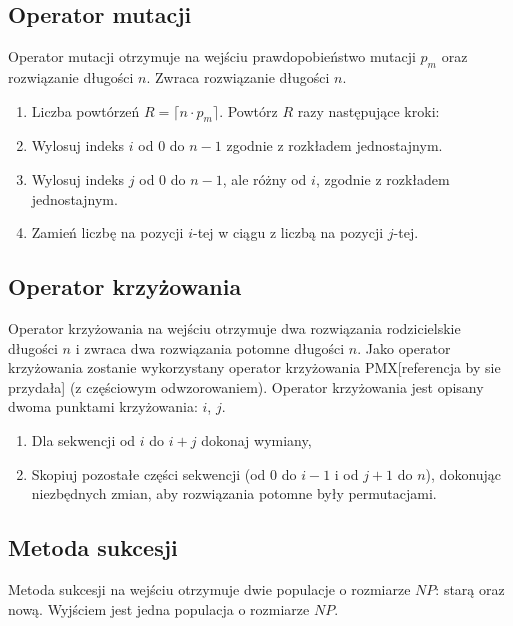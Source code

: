 \documentclass[12pt, a4paper]{article}
\begin{document}
\subsection{Operator mutacji}

Operator mutacji otrzymuje na wejściu prawdopobieństwo mutacji $p_m$ oraz rozwiązanie długości $n$.
Zwraca rozwiązanie długości $n$.

\begin{enumerate}
 \item Liczba powtórzeń $R = \lceil n \cdot  p_m \rceil$. Powtórz $R$ razy następujące kroki:
 \item Wylosuj indeks $i$ od 0 do $n-1$ zgodnie z rozkładem jednostajnym.
 \item Wylosuj indeks $j$ od 0 do $n-1$, ale różny od $i$, zgodnie z rozkładem jednostajnym.
 \item Zamień liczbę na pozycji $i$-tej w ciągu z liczbą na pozycji $j$-tej.
\end{enumerate}

\subsection{Operator krzyżowania}


Operator krzyżowania na wejściu otrzymuje dwa rozwiązania rodzicielskie długości $n$ i zwraca dwa rozwiązania potomne długości $n$. 
Jako operator krzyżowania zostanie wykorzystany operator krzyżowania {PMX}[referencja by sie przydała] (z częściowym odwzorowaniem).
Operator krzyżowania jest opisany dwoma punktami krzyżowania: $i$, $j$.
\begin{enumerate}
 \item Dla sekwencji od $i$ do $i+j$ dokonaj wymiany, %
 \item Skopiuj pozostałe części sekwencji (od $0$ do $i-1$ i od $j+1$ do $n$), dokonując niezbędnych zmian, aby rozwiązania potomne były permutacjami.
\end{enumerate}

\subsection{Metoda sukcesji}

Metoda sukcesji na wejściu otrzymuje dwie populacje o rozmiarze $NP$: starą oraz nową. Wyjściem jest jedna populacja o rozmiarze $NP$.
\end{document}
